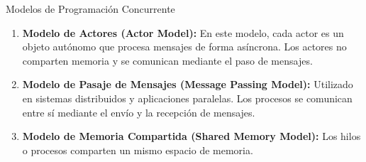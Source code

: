 \documentclass{beamer}
\begin{document}
\begin{frame}{Modelos de Programación Concurrente}

\begin{block}

    \begin{enumerate}
        \item \textbf{Modelo de Actores (Actor Model):} En este modelo, cada actor es un objeto autónomo que procesa mensajes de forma asíncrona. Los actores no comparten memoria y se comunican mediante el paso de mensajes.\pause
        \item \textbf{Modelo de Pasaje de Mensajes (Message Passing Model):} Utilizado en sistemas distribuidos y aplicaciones paralelas. Los procesos se comunican entre sí mediante el envío y la recepción de mensajes.\pause
        \item \textbf{Modelo de Memoria Compartida (Shared Memory Model):} Los hilos o procesos comparten un mismo espacio de memoria. 

    \end{enumerate}
\end{block}
\end{frame}
\end{document}
